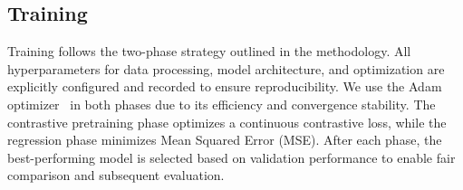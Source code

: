 \documentclass[review]{vgtc}                 %
\begin{document}
\subsection{Training}
Training follows the two-phase strategy outlined in the methodology. All hyperparameters for data processing, model architecture, and optimization are explicitly configured and recorded to ensure reproducibility. We use the Adam optimizer~\cite{kingma2014adam} in both phases due to its efficiency and convergence stability. The contrastive pretraining phase optimizes a continuous contrastive loss, while the regression phase minimizes Mean Squared Error (MSE). After each phase, the best-performing model is selected based on validation performance to enable fair comparison and subsequent evaluation.



\end{document}
